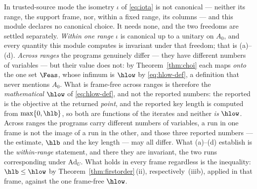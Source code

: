 
\begin{remark}
\label{rem:basis-invariance}
In trusted-source mode the isometry $\iota$ of \eqref{eq:iota} is not
canonical --- neither its range, the support frame, nor, within a fixed
range, its columns --- and this module declares no canonical choice. It
needs none, and the two freedoms are settled separately. \emph{Within one
range} $\iota$ is canonical up to a unitary on $A_0$, and every quantity
this module computes is invariant under that freedom; that is (a)--(d).
\emph{Across ranges} the programs genuinely differ --- they have
different numbers of variables --- but their value does not: by
Theorem~\ref{thm:choi} each maps \emph{onto} the one set $\Feas$, whose
infimum is $\hlow$ by \eqref{eq:hlow-def}, a definition that never
mentions $A_0$. What is frame-free across ranges is therefore the
\emph{mathematical} $\hlow$ of \eqref{eq:hlow-def}, and not the reported
numbers: the reported  is the objective at the returned
\emph{point}, and the reported key length is computed from
$\max\{0,\hlb\}$, so both are functions of the iterates and neither
\emph{is} $\hlow$. Across ranges the programs carry different numbers of
variables, a run in one frame is not the image of a run in the other, and
those three reported numbers --- the estimate, $\hlb$ and the key
length --- may all differ. What (a)--(d) establish is the
\emph{within-range} statement, and there they are invariant, the two runs
corresponding under $\mathrm{Ad}_{U}$. What holds in every frame
regardless is the inequality: $\hlb\le\hlow$ by
Theorem~\ref{thm:firstorder}\,(ii), respectively~(iiib), applied in that
frame, against the one frame-free $\hlow$.


\end{remark}

